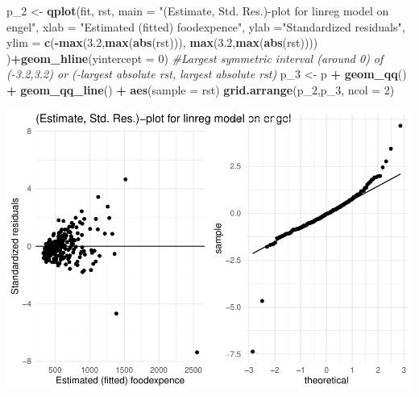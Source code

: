 \documentclass[
]{article}
\newenvironment{Shaded}{\begin{snugshade}}{\end{snugshade}}
\newcommand{\CommentTok}[1]{\textcolor[rgb]{0.56,0.35,0.01}{\textit{#1}}}
\newcommand{\DataTypeTok}[1]{\textcolor[rgb]{0.13,0.29,0.53}{#1}}
\newcommand{\DecValTok}[1]{\textcolor[rgb]{0.00,0.00,0.81}{#1}}
\newcommand{\FloatTok}[1]{\textcolor[rgb]{0.00,0.00,0.81}{#1}}
\newcommand{\KeywordTok}[1]{\textcolor[rgb]{0.13,0.29,0.53}{\textbf{#1}}}
\newcommand{\NormalTok}[1]{#1}
\newcommand{\OperatorTok}[1]{\textcolor[rgb]{0.81,0.36,0.00}{\textbf{#1}}}
\newcommand{\StringTok}[1]{\textcolor[rgb]{0.31,0.60,0.02}{#1}}
\begin{document}
\begin{Shaded}
\begin{Highlighting}[]
\NormalTok{p_}\DecValTok{2}\NormalTok{ <-}\StringTok{ }\KeywordTok{qplot}\NormalTok{(fit, rst, }\DataTypeTok{main =} \StringTok{"(Estimate, Std. Res.)-plot for linreg model on engel"}\NormalTok{, }\DataTypeTok{xlab =} \StringTok{"Estimated (fitted) foodexpence"}\NormalTok{, }\DataTypeTok{ylab =}\StringTok{"Standardized residuals"}\NormalTok{, }\DataTypeTok{ylim =} \KeywordTok{c}\NormalTok{(}\OperatorTok{-}\KeywordTok{max}\NormalTok{(}\FloatTok{3.2}\NormalTok{,}\KeywordTok{max}\NormalTok{(}\KeywordTok{abs}\NormalTok{(rst))), }\KeywordTok{max}\NormalTok{(}\FloatTok{3.2}\NormalTok{,}\KeywordTok{max}\NormalTok{(}\KeywordTok{abs}\NormalTok{(rst)))) )}\OperatorTok{+}\KeywordTok{geom_hline}\NormalTok{(}\DataTypeTok{yintercept =} \DecValTok{0}\NormalTok{) }\CommentTok{#Largest symmetric interval (around 0) of (-3.2,3.2) or (-largest absolute rst, largest absolute rst)}
\NormalTok{p_}\DecValTok{3}\NormalTok{ <-}\StringTok{ }\NormalTok{p }\OperatorTok{+}\StringTok{ }\KeywordTok{geom_qq}\NormalTok{() }\OperatorTok{+}\StringTok{ }\KeywordTok{geom_qq_line}\NormalTok{() }\OperatorTok{+}\StringTok{ }\KeywordTok{aes}\NormalTok{(}\DataTypeTok{sample =}\NormalTok{ rst)}
\KeywordTok{grid.arrange}\NormalTok{(p_}\DecValTok{2}\NormalTok{,p_}\DecValTok{3}\NormalTok{, }\DataTypeTok{ncol =} \DecValTok{2}\NormalTok{)}
\end{Highlighting}
\end{Shaded}

\begin{center}\includegraphics{matstatproblems20-21_files/figure-latex/unnamed-chunk-78-1} \end{center}
\end{document}
